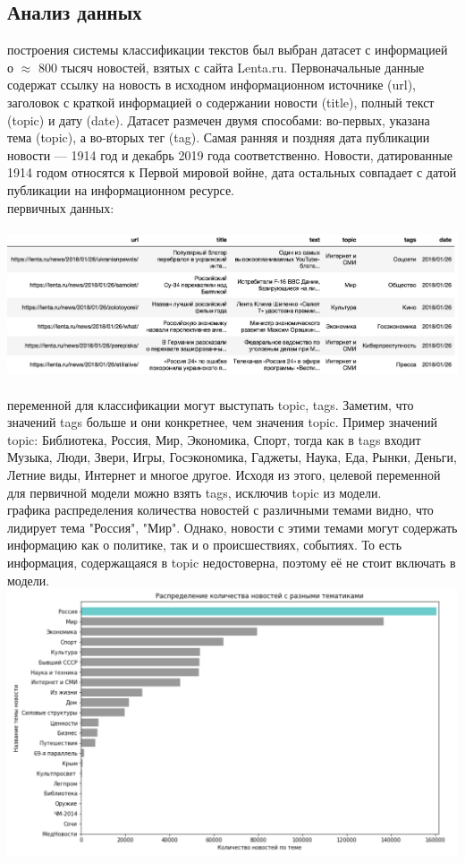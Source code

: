 \documentclass{article}
\newcommand\tab[1][1cm]{\hspace*{#1}}
\begin{document}
\subsection{Анализ данных}
 построения системы классификации текстов был выбран датасет с информацией о $\approx$ 800 тысяч новостей, взятых с сайта Lenta.ru. Первоначальные данные содержат ссылку на новость в исходном информационном источнике (url), заголовок с краткой информацией о содержании новости (title), полный текст (topic) и дату (date). Датасет размечен двумя способами: во-первых, указана тема (topic), а во-вторых тег (tag). Самая ранняя и поздняя дата публикации новости — 1914 год и декабрь 2019 года соответственно. Новости, датированные 1914 годом относятся к Первой мировой войне, дата остальных совпадает с датой публикации на информационном ресурсе.\\
 первичных данных:\\
\\
\includegraphics[scale=0.55]{f1.png}\\
\\
 переменной для классификации могут выступать topic, tags. Заметим, что значений tags больше и они конкретнее, чем значения topic. Пример значений topic: Библиотека, Россия, Мир, Экономика, Спорт, тогда как в tags входит Музыка, Люди, Звери, Игры, Госэкономика, Гаджеты, Наука, Еда, Рынки, Деньги, Летние виды, Интернет и многое другое. Исходя из этого, целевой переменной для первичной модели можно взять tags, исключив topic из модели.\\
 графика распределения количества новостей с различными темами видно, что лидирует тема "Россия", "Мир". Однако, новости с этими темами могут содержать информацию как о политике, так и о происшествиях, событиях. То есть информация, содержащаяся в topic недостоверна, поэтому её не стоит включать в модели.\\
\includegraphics[scale=0.6]{f2.png}\\
\end{document}

